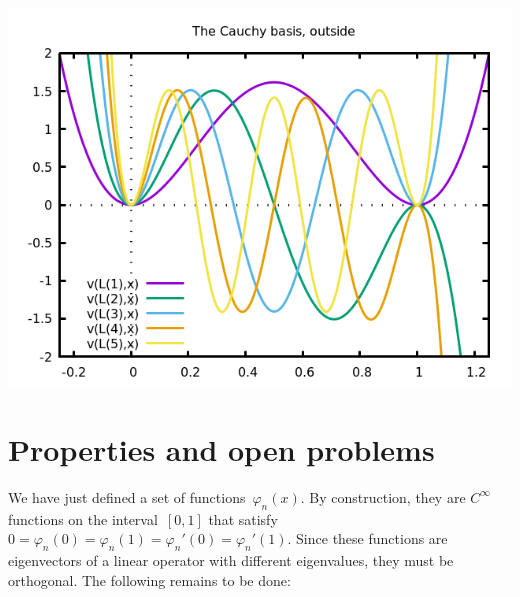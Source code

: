 \includegraphics{cauchy2.png}

\section{Properties and open problems}

We have just defined a set of functions~$\varphi_n(x)$.  By construction,
they are $C^\infty$ functions on the interval~$[0,1]$ that
satisfy~$0=\varphi_n(0)=\varphi_n(1)=\varphi_n'(0)=\varphi_n'(1)$.  Since
these functions are eigenvectors of a linear operator with different
eigenvalues, they must be orthogonal.  The following remains to be
done:

